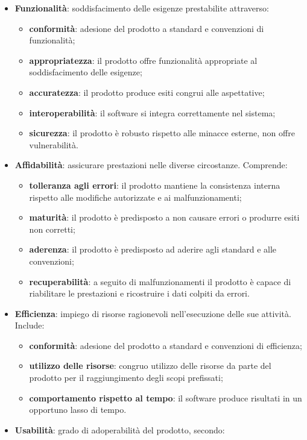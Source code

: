 \begin{itemize}
	\item \textbf{Funzionalità}: soddisfacimento delle esigenze prestabilite attraverso:
	\begin{itemize}
		\item \textbf{conformità}: adesione del prodotto a standard e convenzioni di funzionalità;
		\item \textbf{appropriatezza}: il prodotto offre funzionalità appropriate al soddisfacimento delle esigenze;
		\item \textbf{accuratezza}: il prodotto produce esiti congrui alle aspettative;
		\item \textbf{interoperabilità}: il software si integra correttamente nel sistema;
		\item \textbf{sicurezza}: il prodotto è robusto rispetto alle minacce esterne, non offre vulnerabilità.
	\end{itemize}
	\item \textbf{Affidabilità}: assicurare prestazioni nelle diverse circostanze. Comprende:
	\begin{itemize}
		\item \textbf{tolleranza agli errori}: il prodotto mantiene la consistenza interna rispetto alle modifiche autorizzate e ai malfunzionamenti;
		\item \textbf{maturità}: il prodotto è predisposto a non causare errori o  produrre esiti non corretti;
		\item \textbf{aderenza}: il prodotto è predisposto ad aderire agli standard e alle convenzioni;
		\item \textbf{recuperabilità}: a seguito di malfunzionamenti il prodotto è capace di riabilitare le prestazioni e ricostruire i dati colpiti da errori.
	\end{itemize}
	\item \textbf{Efficienza}: impiego di risorse ragionevoli nell'esecuzione delle sue attività. Include:
	\begin{itemize}
		\item \textbf{conformità}: adesione del prodotto a standard e convenzioni di efficienza;
		\item \textbf{utilizzo delle risorse}: congruo utilizzo delle risorse da parte del prodotto per il raggiungimento degli scopi prefissati;
		\item \textbf{comportamento rispetto al tempo}: il software produce risultati in un opportuno lasso di tempo.
	\end{itemize}
	\item \textbf{Usabilità}: grado di adoperabilità del prodotto, secondo:

\end{itemize}
